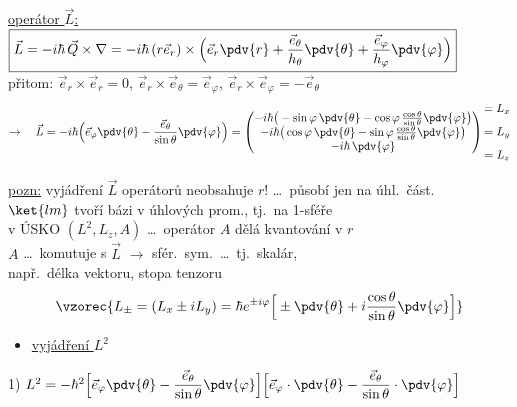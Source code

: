 \underline{operátor $\vec L$:} \quad
$\boxed{\vec L = -i\hbar\,\vec Q\times\nabla = -i\hbar\,(r\vec e_r)\times\Big(\vec e_r\pdv{r} + \frac{\vec e_\theta}{h_\theta}\pdv{\theta} + \frac{\vec e_\varphi}{h_\varphi}\pdv{\varphi}\Big)}$ \\
\hspace*{5cm} přitom: \quad $\vec e_r\times\vec e_r = 0$, \quad $\vec e_r\times\vec e_\theta = \vec e_\varphi$, \quad $\vec e_r\times\vec e_\varphi = -\vec e_\theta$
\[
  \to\quad \vec L = -i\hbar\Big(\vec e_\varphi\pdv{\theta} - \frac{\vec e_\theta}{\sin\theta}\pdv{\varphi}\Big)
  = \begin{pmatrix}
      -i\hbar\big(-\sin\varphi\,\pdv{\theta} - \cos\varphi\,\frac{\cos\theta}{\sin\theta}\pdv{\varphi}\big) \\
      -i\hbar\big(\cos\varphi\,\pdv{\theta} - \sin\varphi\,\frac{\cos\theta}{\sin\theta}\pdv{\varphi}\big) \\
      -i\hbar\,\pdv{\varphi}
    \end{pmatrix}
  \begin{matrix} = L_x \\[8pt] = L_y \\[8pt] = L_z \end{matrix}
\]

\underline{pozn:} vyjádření $\vec L$ operátorů neobsahuje $r$! \dots\ působí jen na úhl.\ část. \\
\quad $\ket{lm}$ tvoří bázi v úhlových prom., tj.\ na 1-sféře \\
v ÚSKO $(L^2, L_z, A)$ \dots\ operátor $A$ dělá kvantování v $r$ \\
\hspace*{3cm} $A$ \dots\ komutuje s $\vec L$ $\to$ sfér.\ sym.\ \dots\ tj.\ skalár, \\
\hspace*{6cm} např.\ délka vektoru, stopa tenzoru
\[
  \vzorec{L_\pm = (L_x \pm iL_y) = \hbar e^{\pm i\varphi}\Big[\pm\pdv{\theta} + i\frac{\cos\theta}{\sin\theta}\pdv{\varphi}\Big]}
\]

\begin{itemize}
  \item \underline{vyjádření $L^2$}
\end{itemize}
1) \quad $L^2 = -\hbar^2\Big[\vec e_\varphi\pdv{\theta} - \dfrac{\vec e_\theta}{\sin\theta}\pdv{\varphi}\Big]\Big[\vec e_\varphi\cdot\pdv{\theta} - \dfrac{\vec e_\theta}{\sin\theta}\cdot\pdv{\varphi}\Big]$

